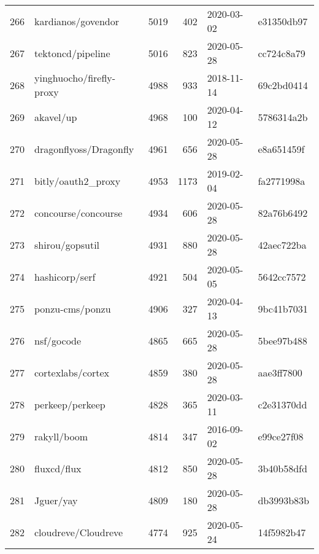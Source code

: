 \begin{footnotesize}
\begin{longtable}{llrrll}
        266 &                                 kardianos/govendor &   5019 &    402 & 2020-03-02 &  e31350db97 \\
        267 &                                  tektoncd/pipeline &   5016 &    823 & 2020-05-28 &  cc724c8a79 \\
        268 &                           yinghuocho/firefly-proxy &   4988 &    933 & 2018-11-14 &  69c2bd0414 \\
        269 &                                          akavel/up &   4968 &    100 & 2020-04-12 &  5786314a2b \\
        270 &                             dragonflyoss/Dragonfly &   4961 &    656 & 2020-05-28 &  e8a651459f \\
        271 &                                 bitly/oauth2\_proxy &   4953 &   1173 & 2019-02-04 &  fa2771998a \\
        272 &                                concourse/concourse &   4934 &    606 & 2020-05-28 &  82a76b6492 \\
        273 &                                    shirou/gopsutil &   4931 &    880 & 2020-05-28 &  42aec722ba \\
        274 &                                     hashicorp/serf &   4921 &    504 & 2020-05-05 &  5642cc7572 \\
        275 &                                    ponzu-cms/ponzu &   4906 &    327 & 2020-04-13 &  9bc41b7031 \\
        276 &                                         nsf/gocode &   4865 &    665 & 2020-05-28 &  5bee97b488 \\
        277 &                                  cortexlabs/cortex &   4859 &    380 & 2020-05-28 &  aae3ff7800 \\
        278 &                                    perkeep/perkeep &   4828 &    365 & 2020-03-11 &  c2e31370dd \\
        279 &                                        rakyll/boom &   4814 &    347 & 2016-09-02 &  e99ce27f08 \\
        280 &                                        fluxcd/flux &   4812 &    850 & 2020-05-28 &  3b40b58dfd \\
        281 &                                          Jguer/yay &   4809 &    180 & 2020-05-28 &  db3993b83b \\
        282 &                                cloudreve/Cloudreve &   4774 &    925 & 2020-05-24 &  14f5982b47 \\

\end{longtable}
\end{footnotesize}
